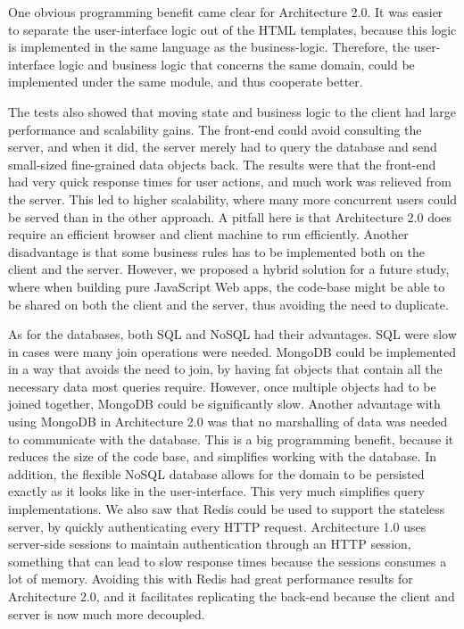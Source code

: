 One obvious programming benefit came clear for Architecture 2.0. It was easier to separate the user-interface logic out of the HTML templates, because this logic is implemented in the same language as the business-logic. Therefore, the user-interface logic and business logic that concerns the same domain, could be implemented under the same module, and thus cooperate better.  

The tests also showed that moving state and business logic to the client had large performance and scalability gains. The front-end could avoid consulting the server, and when it did, the server merely had to query the database and send small-sized fine-grained data objects back. The results were that the front-end had very quick response times for user actions, and much work was relieved from the server. This led to higher scalability, where many more concurrent users could be served than in the other approach. A pitfall here is that Architecture 2.0 does require an efficient browser and client machine to run efficiently. Another disadvantage is that some business rules has to be implemented both on the client and the server. However, we proposed a hybrid solution for a future study, where when building pure JavaScript Web apps, the code-base might be able to be shared on both the client and the server, thus avoiding the need to duplicate. 

As for the databases, both SQL and NoSQL had their advantages. SQL were slow in cases were many join operations were needed. MongoDB could be implemented in a way that avoids the need to join, by having fat objects that contain all the necessary data most queries require. However, once multiple objects had to be joined together, MongoDB could be significantly slow. Another advantage with using MongoDB in Architecture 2.0 was that no marshalling of data was needed to communicate with the database. This is a big programming benefit, because it reduces the size of the code base, and simplifies working with the database. In addition, the flexible NoSQL database allows for the domain to be persisted exactly as it looks like in the user-interface. This very much simplifies query implementations. We also saw that Redis could be used to support the stateless server, by quickly authenticating every HTTP request. Architecture 1.0 uses server-side sessions to maintain authentication through an HTTP session, something that can lead to slow response times because the sessions consumes a lot of memory. Avoiding this with Redis had great performance results for Architecture 2.0, and it facilitates replicating the back-end because the client and server is now much more decoupled.


